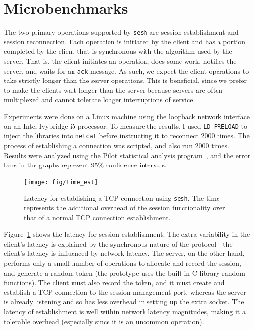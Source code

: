 \documentclass[twocolumn,11pt]{article}
\newcommand{\sesh}{\texttt{sesh}\xspace}
\begin{document}
\section{Microbenchmarks}

The two primary operations supported by \sesh are session establishment and
session reconnection. Each operation is initiated by the client and has a
portion completed by the client that is synchronous with the algorithm used by
the server. That is, the client initiates an operation, does some work, notifies
the server, and waits for an \texttt{ack} message. As such, we expect the client
operations to take strictly longer than the server operations. This is
beneficial, since we prefer to make the clients wait longer than the server
because servers are often multiplexed and cannot tolerate longer interruptions
of service.

Experiments were done on a Linux machine using the loopback network
interface on an Intel Ivybridge i5 processor. To measure the results, I used
\texttt{LD\_PRELOAD} to inject the libraries into \texttt{netcat} before
instructing it to reconnect 2000 times. The process of establishing a connection
was scripted, and also run 2000 times. Results were analyzed using the Pilot
statistical analysis program~\cite{pilot}, and the error bars in the graphs
represent 95\% confidence intervals.

\begin{figure}[!htb]
	\centering
	\hspace*{-3mm}
	\texttt{[image: fig/time\_est]}
	\caption{Latency for establishing a TCP connection using \sesh. The time
	represents the additional overhead of the session functionality over that of
	a normal TCP connection establishment.}
	\label{fig:est}
\end{figure}

Figure~\ref{fig:est} shows the latency for session establishment. The extra
variability in the client's latency is explained by the synchronous nature of
the protocol---the client's latency is influenced by network latency. The
server, on the other hand, performs only a small number of operations to
allocate and record the session, and generate a random token (the prototype uses
the built-in C library random functions). The client must also record the token,
and it must create and establish a TCP connection to the session management
port, whereas the server is already listening and so has less overhead in
setting up the extra socket.
The latency of establishment is well within network latency magnitudes, making
it a tolerable overhead (especially since it is an uncommon operation).
\end{document}
